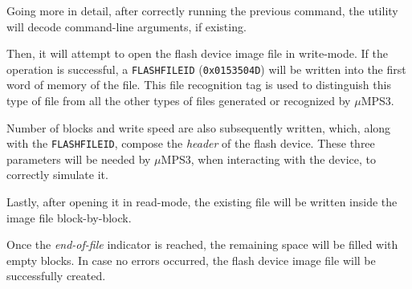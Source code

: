 \documentclass[12pt,a4paper,openright,twoside]{report}
\begin{document}
Going more in detail, after correctly running the previous command, the utility will decode command-line arguments, if existing.

Then, it will attempt to open the flash device image file in write-mode.
If the operation is successful, a \texttt{FLASHFILEID} (\texttt{0x0153504D}) will be written into the first word of memory of the file.
This file recognition tag is used to distinguish this type of file from all the other types of files generated or recognized by $\mu$MPS3.

Number of blocks and write speed are also subsequently written, which, along with the \texttt{FLASHFILEID}, compose the \textit{header} of the flash device.
These three parameters will be needed by $\mu$MPS3, when interacting with the device, to correctly simulate it.

Lastly, after opening it in read-mode, the existing file will be written inside the image file block-by-block.

Once the \textit{end-of-file} indicator is reached, the remaining space will be filled with empty blocks.
In case no errors occurred, the flash device image file will be successfully created.
\end{document}
